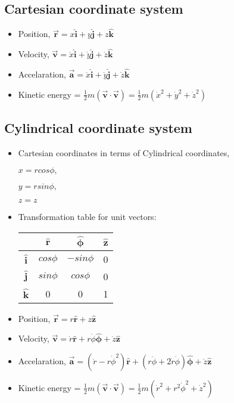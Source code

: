 \documentclass{article}
\newcommand{\uvec}[1]{\bm{\hat{#1}}}
\begin{document}
\subsection{Cartesian coordinate system}
\begin{itemize}
    \item Position, $\bm{\vec{r}} = x\uvec{i} + y\uvec{j} + z\uvec{k}$
    \item Velocity, $\bm{\vec{v}} = \dot{x}\uvec{i} + \dot{y}\uvec{j} +\dot{z}\uvec{k}$
    \item Accelaration, $\bm{\vec{a}} = \ddot{x}\uvec{i} + \ddot{y}\uvec{j} + \ddot{z}\uvec{k}$
    \item Kinetic energy = $\frac{1}{2}m(\bm{\vec{v}\cdot\vec{v}}) = \frac{1}{2}m(\dot{x}^2 + \dot{y}^2 + \dot{z}^2)$
\end{itemize}

\subsection{Cylindrical coordinate system}
\begin{itemize}
    \item Cartesian coordinates in terms of Cylindrical coordinates,
    \begin{center}
        $x = rcos\phi,$ 
        
        $y = rsin\phi,$ 
        
        $z = z$
    \end{center}
    \item Transformation table for unit vectors:
    \begin{center}
    \begin{tabular}{ c | c | c | c}
                   & $\uvec{r}$ & $\uvec{\phi}$ & $\uvec{z}$\\
        \hline
        $\uvec{i}$ & $cos\phi $ & $-sin\phi$ & 0\\
        \hline  
        $\uvec{j}$ & $sin\phi $ & $cos\phi$ & 0\\
        \hline
        $\uvec{k}$ & 0 & 0 & 1\\
    \end{tabular}
    \end{center}
    \item Position, $\bm{\vec{r}} = r\uvec{r} + z\uvec{z}$
    \item Velocity, $\bm{\vec{v}} = \dot{r}\uvec{r} + r\dot{\phi}\uvec{\phi} + \dot{z}\uvec{z}$
    \item Accelaration, $\bm{\vec{a}} = (\ddot{r} - r\dot{\phi}^2)\uvec{r} + (r\ddot{\phi} + 2\dot{r}\dot{\phi})\uvec{\phi} + \ddot{z}\uvec{z}$
    \item Kinetic energy = $\frac{1}{2}m(\bm{\vec{v}\cdot\vec{v}}) = \frac{1}{2}m(\dot{r}^2 + r^2\dot{\phi}^2 + \dot{z}^2)$
\end{itemize}
\end{document}
